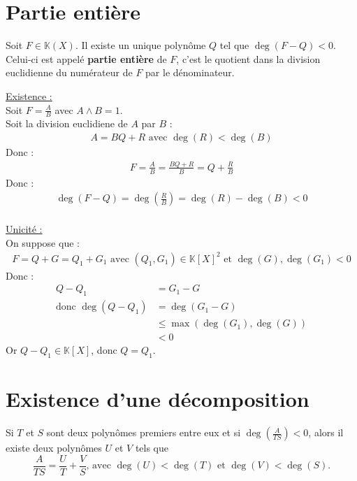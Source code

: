 \documentclass[../main.tex]{subfiles}
\begin{document}
\section{Partie entière}
\begin{tcolorbox}[title=Théorème 17.25, title filled=false, colframe=orange, colback=orange!10!white]
    Soit $F \in \mathbb{K}(X)$. Il existe un unique polynôme $Q$ tel que $\deg(F - Q) < 0$. Celui-ci est appelé \textbf{partie entière} de $F$, c'est le quotient dans la division euclidienne du numérateur de $F$ par le dénominateur. 
\end{tcolorbox}

\noindent \underline{Existence :} \\
Soit $F = \frac{A}{B}$ avec $A \wedge B = 1$. \\
Soit la division euclidiene de $A$ par $B$ : 
\begin{align*}
    A = BQ + R \text{ avec } \deg(R) < \deg(B)
\end{align*}
Donc : 
\begin{align*}
    F = \frac{A}{B} = \frac{BQ + R}{B} = Q + \frac{R}{B}
\end{align*}
Donc : 
\begin{align*}
    \deg(F - Q) = \deg\left(\frac{R}{B}\right) = \deg(R) - \deg(B) < 0
\end{align*} \\

\noindent \underline{Unicité :} \\
On suppose que : 
\begin{align*}
    F = Q + G = Q_1 + G_1 \text{ avec } (Q_1, G_1) \in \mathbb{K}[X]^2 \text{ et } \deg(G), \deg(G_1) < 0
\end{align*}
Donc :
\begin{align*}
    Q - Q_1 &= G_1 - G \\
    \text{donc } \deg(Q - Q_1) &= \deg(G_1 - G) \\
    &\leq \max(\deg(G_1), \deg(G)) \\
    &< 0
\end{align*}
Or $Q - Q_1 \in \mathbb{K}[X]$, donc $Q = Q_1$. 

\section{Existence d'une décomposition}
\begin{tcolorbox}[title=Théorème 17.31, title filled=false, colframe=orange, colback=orange!10!white]
    Si $T$ et $S$ sont deux polynômes premiers entre eux et si $\deg \left( \frac{A}{TS} \right) < 0$, alors il existe deux polynômes $U$ et $V$ tels que
    $$\frac{A}{TS} = \frac{U}{T} + \frac{V}{S} \text{, avec } \deg(U) < \deg(T) \text{ et } \deg(V) < \deg(S).$$
\end{tcolorbox}
\end{document}
